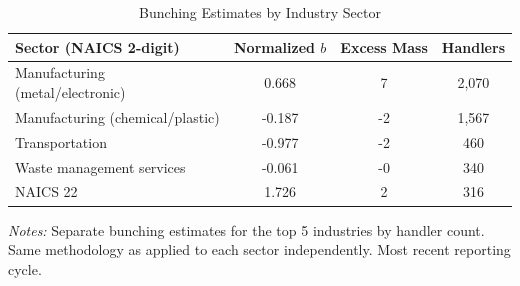 
\begin{table}[H]
\centering
\caption{Bunching Estimates by Industry Sector}
\begin{threeparttable}
\begin{tabular}{lccc}
\toprule
Sector (NAICS 2-digit) & Normalized $b$ & Excess Mass & Handlers \\
\midrule
Manufacturing (metal/electronic) & 0.668 & 7 & 2,070 \\
Manufacturing (chemical/plastic) & -0.187 & -2 & 1,567 \\
Transportation & -0.977 & -2 & 460 \\
Waste management services & -0.061 & -0 & 340 \\
NAICS 22 & 1.726 & 2 & 316 \\
\bottomrule
\end{tabular}
\begin{tablenotes}[flushleft]
\small
\item \textit{Notes:} Separate bunching estimates for the top 5 industries by handler count. Same methodology as  applied to each sector independently. Most recent reporting cycle.
\end{tablenotes}
\end{threeparttable}
\label{tab:industry}
\end{table}
